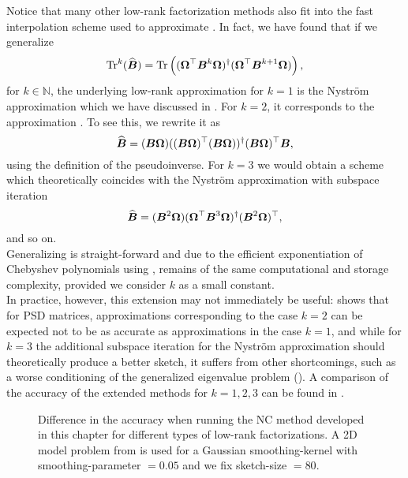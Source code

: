 Notice that many other low-rank factorization methods \cite{halko2011finding,tropp2023randomized}
also fit into the fast interpolation scheme used to approximate .
In fact, we have found that if we generalize
\begin{equation}
    \operatorname{Tr}^{k}(\widehat{\boldsymbol{B}})
        = \operatorname{Tr}\left((\boldsymbol{\Omega}^{\top} \boldsymbol{B}^k \boldsymbol{\Omega})^{\dagger} (\boldsymbol{\Omega}^{\top} \boldsymbol{B}^{k+1} \boldsymbol{\Omega}) \right),
    \label{equ:3-nystrom-trace-generalization}
\end{equation}
for $k \in \mathbb{N}$,
the underlying low-rank approximation for $k=1$ is the Nystr\"om approximation
which we have discussed in .
For $k=2$, it corresponds to the approximation .
To see this, we rewrite it as
\begin{equation}
    \widehat{\boldsymbol{B}} = (\boldsymbol{B} \boldsymbol{\Omega}) ((\boldsymbol{B} \boldsymbol{\Omega})^{\top} (\boldsymbol{B} \boldsymbol{\Omega}))^{\dagger} (\boldsymbol{B} \boldsymbol{\Omega})^{\top} \boldsymbol{B},
    \label{equ:3-nystrom-RSVD-rewritten}
\end{equation}
using the definition of the pseudoinverse.
For $k=3$ we would obtain a scheme which theoretically coincides with the Nystr\"om
approximation with subspace iteration \cite{tropp2023randomized}
\begin{equation}
    \widehat{\boldsymbol{B}} = (\boldsymbol{B}^2 \boldsymbol{\Omega}) (\boldsymbol{\Omega}^{\top} \boldsymbol{B}^3 \boldsymbol{\Omega})^{\dagger} (\boldsymbol{B}^2 \boldsymbol{\Omega})^{\top},
    \label{equ:3-nystrom-nystrom-SI}
\end{equation}
and so on.\\

Generalizing  is straight-forward and
due to the efficient exponentiation of Chebyshev polynomials using
, remains of the same
computational and storage complexity, provided we consider $k$ as a small constant.\\

In practice, however, this extension may not immediately be useful: \cite[lemma~5.2]{tropp2023randomized}
shows that for \gls{PSD} matrices, approximations corresponding to the case $k=2$
can be expected not to be as accurate as approximations in the case $k=1$, and
while for $k=3$ the additional subspace iteration for the Nystr\"om approximation
should theoretically produce a better sketch, it suffers from other shortcomings,
such as a worse conditioning of the generalized eigenvalue problem ().
A comparison of the accuracy of the extended methods for $k=1, 2, 3$ can be
found in .

\begin{figure}[ht]
    \centering
    
    \caption{Difference in the accuracy when running the \gls{NC} method developed in this
    chapter for different types of low-rank factorizations.
    A 2D model problem from 
    is used for a Gaussian \gls{smoothing-kernel} with \gls{smoothing-parameter} $=0.05$
    and we fix \gls{sketch-size} $=80$.}
    \label{fig:3-nystrom-other-approximations}
\end{figure}
